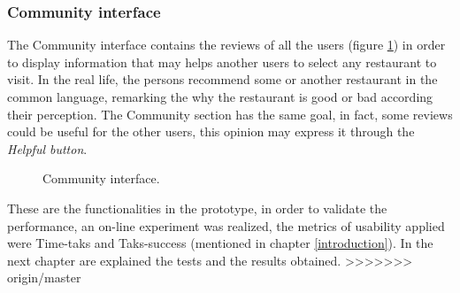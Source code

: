 \subsubsection{Community interface}
The Community interface contains the reviews of all the users (figure
\ref{fig:community}) in order to display information that may helps 
another users to select any restaurant to visit. In the real life, the 
persons recommend some or another restaurant in the common 
language, remarking the why the restaurant is good or bad according 
their perception. The Community section has the same goal, in fact, 
some reviews could be useful for the other users, this opinion may 
express it through the \textit{Helpful button}.
\begin{figure}
\captionsetup{font=footnotesize}
\centering
{}
\caption{Community interface.}
\label{fig:community}   
\end{figure}

These are the functionalities in the prototype, in order to validate
the performance, an on-line experiment was realized, the metrics 
of usability applied were Time-taks and Taks-success (mentioned 
in chapter  \ref{introduction}). In the next chapter are 
explained the tests  and the results obtained.
>>>>>>> origin/master







